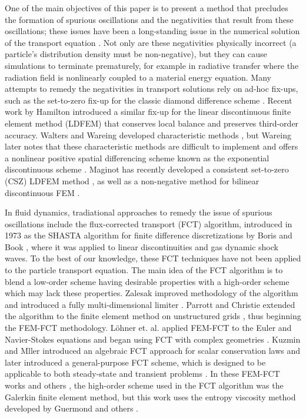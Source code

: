 One of the main objectives of this paper is to present a method that precludes
the formation of spurious oscillations and the negativities that result from
these oscillations; these issues have been a long-standing issue in the
numerical solution of the transport equation \cite{lanthrop}.
Not only are these negativities physically incorrect
(a particle's distribution density must be non-negative), but they can cause
simulations to terminate prematurely, for example in radiative transfer where
the radiation field is nonlinearly coupled to a material energy equation.
Many attempts to remedy the negativities in
transport solutions rely on ad-hoc fix-ups, such as the set-to-zero fix-up for the
classic diamond difference scheme \cite{lewis}. Recent work by Hamilton
introduced a similar fix-up for the linear discontinuous finite element
method (LDFEM) that conserves local balance and preserves third-order accuracy.
Walters and Wareing developed characteristic methods \cite{walters_NC}, but
Wareing later notes that these characteristic methods are difficult to
implement and offers a nonlinear positive spatial differencing scheme
known as the exponential discontinuous scheme \cite{wareing}.
Maginot has recently developed a consistent set-to-zero (CSZ) LDFEM
method \cite{maginot}, as well as a non-negative method for bilinear
discontinuous FEM \cite{maginot_mc2015}\cite{maginot_2017}.

In fluid dynamics, tradiational approaches to remedy the issue of spurious oscillations include
the flux-corrected transport (FCT) algorithm, introduced in 1973 as
the SHASTA algorithm for finite difference discretizations
by Boris and Book \cite{borisbook}, where it was applied to linear discontinuities
and gas dynamic shock waves. To the best of our knowledge, these FCT techniques have not been
applied to the particle transport equation.
The main idea of the FCT algorithm is to blend a
low-order scheme having desirable properties with a high-order scheme which may
lack these properties.
Zalesak improved methodology of the algorithm and introduced a fully
multi-dimensional limiter \cite{zalesak}.
Parrott and Christie extended the algorithm to the finite element method
on unstructured grids \cite{parrott}, thus beginning the FEM-FCT methodology.
L\"{o}hner et. al. applied FEM-FCT to the Euler and Navier-Stokes equations and
began using FCT with complex geometries \cite{lohner}.
Kuzmin and Mller introduced an algebraic FCT approach for scalar conservation
laws \cite{kuzmin_FCT} and later introduced a general-purpose FCT scheme, which
is designed to be applicable to both steady-state and transient problems \cite{kuzmin_general}.
In these FEM-FCT works and others \cite{moller_2008,kuzmin_failsafe,kuzmin_closepacking},
the high-order scheme used in the FCT algorithm was the Galerkin finite element
method, but this work uses the entropy viscosity method developed by Guermond
and others \cite{guermond_ev}.

